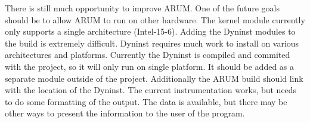 \documentclass[11pt,letterpaper,oneside]{article}
\begin{document}
There is still much opportunity to improve ARUM.   One of the future goals should be to allow ARUM to run on other hardware.  The kernel module currently only supports a single architecture (Intel-15-6).  Adding the Dyninst modules to the build is extremely difficult.  Dyninst requires much work to install on various architectures and platforms.   Currently the Dyninst is compiled and commited with the project, so it will only run on single platform.  It should be added as a separate module outside of the project.  Additionally the ARUM build should link with the location of the Dyninst.
\newline
The current instrumentation works, but needs to do some formatting of the output.  The data is available, but there may be other ways to present the information to the user of the program.
\newline




\end{document}
